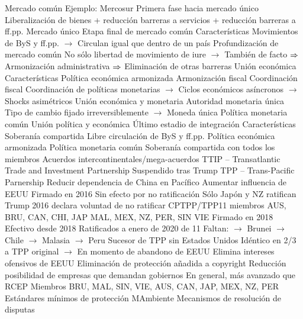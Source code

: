 \documentclass{nuevotema}
\begin{document}
\begin{esquemal}
			\3 Mercado común
				\4 Ejemplo:
				\4[] Mercosur
				\4 Primera fase hacia mercado único
				\4 Liberalización de bienes
				\4[] + reducción barreras a servicios
				\4[] + reducción barreras a ff.pp.
			\3 Mercado único
				\4 Etapa final de mercado común
				\4 Características
				\4[] Movimientos de ByS y ff.pp.
				\4[] $\to$ Circulan igual que dentro de un país
				\4 Profundización de mercado común
				\4[] No sólo libertad de movimiento de iure
				\4[] $\to$ También de facto
				\4[] $\Rightarrow$ Armonización administrativa
				\4[] $\Rightarrow$ Eliminación de otras barreras
			\3 Unión económica
				\4 Características
				\4[] Política económica armonizada
				\4[] Armonización fiscal
				\4[] Coordinación fiscal
				\4[] Coordinación de políticas monetarias
				\4[] $\to$ Ciclos económicos asíncronos
				\4[] $\to$ Shocks asimétricos
			\3 Unión económica y monetaria
				\4 Autoridad monetaria única
				\4 Tipo de cambio fijado irreversiblemente
				\4[] $\to$ Moneda única
				\4 Política monetaria común
			\3 Unión política y económica
				\4 Último estadio de integración
				\4 Características
				\4[] Soberanía compartida
				\4[] Libre circulación de ByS y ff.pp.
				\4[] Política económica armonizada
				\4[] Política monetaria común
				\4[] Soberanía compartida con todos los miembros
	\1 
		\2 Acuerdos intercontinentales/mega-acuerdos
			\3 TTIP -- Transatlantic Trade and Investment Partnership
				\4 Suspendido tras Trump
			\3 TPP -- Trans-Pacific Parnership
				\4 Reducir dependencia de China en Pacífico
				\4 Aumentar influencia de EEUU
				\4 Firmado en 2016
				\4 Sin efecto por no ratificación
				\4[] Sólo Japón y NZ ratifican
				\4[] Trump 2016 declara voluntad de no ratificar
			\3 CPTPP/TPP11
				 miembros
				\4[] AUS, BRU, CAN, CHI, JAP
				\4[] MAL, MEX, NZ, PER, SIN
				\4[] VIE
				\4 Firmado en 2018
				\4 Efectivo desde 2018
				\4 Ratificados a enero de 2020
				 de 11
				\4[] Faltan:
				\4[] $\to$ Brunei
				\4[] $\to$ Chile
				\4[] $\to$ Malasia
				\4[] $\to$ Peru
				\4 Sucesor de TPP sin Estados Unidos
				\4[] Idéntico en 2/3 a TPP original
				\4[] $\to$ En momento de abandono de EEUU
				\4 Elimina intereses ofensivos de EEUU
				\4[] Eliminación de protección añadida a copyright
				\4[] Reducción posibilidad de empresas que demandan gobiernos
				\4 En general, más avanzado que RCEP
				\4 Miembros
				\4[] BRU, MAL, SIN, VIE, AUS, CAN, JAP,
				\4[] MEX, NZ, PER
				\4 Estándares mínimos de protección MAmbiente
				\4 Mecanismos de resolución de disputas

\end{esquemal}
\end{document}
